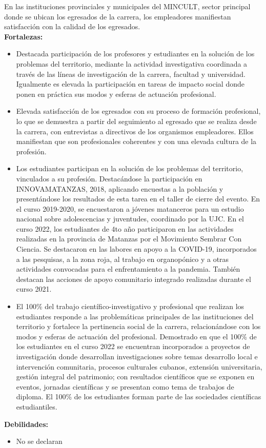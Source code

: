 En las instituciones provinciales y municipales del MINCULT, sector principal donde se ubican los egresados de la carrera, los empleadores manifiestan satisfacción con la calidad de los egresados.\\

\textbf{Fortalezas:}

\begin{itemize}
	\setlength\itemsep{-0.5em}
	\item Destacada participación de los profesores y estudiantes en la solución de los problemas del territorio, mediante la actividad investigativa coordinada a través de las líneas de investigación de la carrera, facultad y universidad. Igualmente es elevada la participación en tareas de impacto social donde ponen en práctica sus modos y esferas de actuación profesional.
	\item Elevada satisfacción de los egresados con su proceso de formación profesional, lo que se demuestra a partir del seguimiento al egresado que se realiza desde la carrera, con entrevistas a directivos de los organismos empleadores. Ellos manifiestan que son profesionales coherentes y con una elevada cultura de la profesión.
	\item Los estudiantes participan en la solución de los problemas del territorio, vinculados a su profesión. Destacándose la participación en INNOVAMATANZAS, 2018, aplicando encuestas a la población y presentándose los resultados de esta tarea en el taller de cierre del evento. En el curso 2019-2020, se encuestaron a jóvenes matanceros para un estudio nacional sobre adolescencias y juventudes, coordinado por la UJC. En el curso 2022, los estudiantes de 4to año participaron en las actividades realizadas en la provincia de Matanzas por el Movimiento Sembrar Con Ciencia. Se destacaron en las labores en apoyo a la COVID-19, incorporados a las pesquisas, a la zona roja, al trabajo en organopónico y a otras actividades convocadas para el enfrentamiento a la pandemia. También destacan las acciones de apoyo comunitario integrado realizadas durante el curso 2021.
	\item El 100\% del trabajo científico-investigativo y profesional que realizan los estudiantes responde a las problemáticas principales de las instituciones del territorio y fortalece la pertinencia social de la carrera, relacionándose con los modos y esferas de actuación del profesional. Demostrado en que el 100\% de los estudiantes en el curso 2022 se encuentran incorporados a proyectos de investigación donde desarrollan investigaciones sobre temas desarrollo local e intervención comunitaria, procesos culturales cubanos, extensión universitaria, gestión integral del patrimonio; con resultados científicos que se exponen en eventos, jornadas científicas y se presentan como tema de trabajos de diploma. El 100\% de los estudiantes forman parte de las sociedades científicas estudiantiles.
\end{itemize}

\textbf{Debilidades:}
\begin{itemize}
	\setlength\itemsep{-0.5em}
	\item No se declaran
\end{itemize}